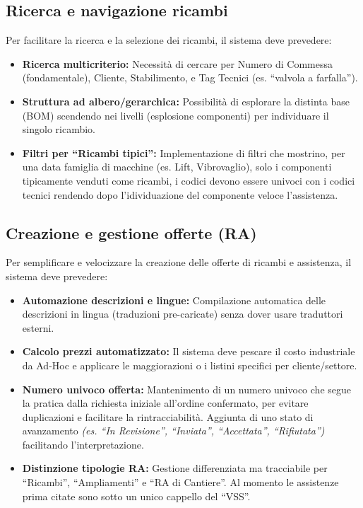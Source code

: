 \documentclass[12pt, a4paper]{article} %
\begin{document}
\subsection{Ricerca e navigazione ricambi}
Per facilitare la ricerca e la selezione dei ricambi, il sistema deve prevedere:
\begin{itemize}
      \item \textbf{Ricerca multicriterio:} Necessità di cercare per Numero di Commessa (fondamentale), Cliente, Stabilimento, e Tag Tecnici (es. ``valvola a farfalla'').
      \item \textbf{Struttura ad albero/gerarchica:} Possibilità di esplorare la distinta base (BOM) scendendo nei livelli (esplosione componenti) per individuare il singolo ricambio.
      \item \textbf{Filtri per ``Ricambi tipici'':} Implementazione di filtri che mostrino, per una data famiglia di macchine (es. Lift, Vibrovaglio), solo i componenti tipicamente venduti come ricambi,
            i codici devono essere univoci con i codici tecnici rendendo dopo l'idividuazione del componente veloce l'assistenza.
\end{itemize}

\subsection{Creazione e gestione offerte (RA)}
Per semplificare e velocizzare la creazione delle offerte di ricambi e assistenza, il sistema deve prevedere:
\begin{itemize}
      \item \textbf{Automazione descrizioni e lingue:} Compilazione automatica delle descrizioni in lingua (traduzioni pre-caricate) senza dover usare traduttori esterni.
      \item \textbf{Calcolo prezzi automatizzato:} Il sistema deve pescare il costo industriale da Ad-Hoc e applicare le maggiorazioni o i listini specifici per cliente/settore.
      \item \textbf{Numero univoco offerta:} Mantenimento di un numero univoco che segue la pratica dalla richiesta iniziale all'ordine confermato, per evitare duplicazioni e facilitare la rintracciabilità.
            Aggiunta di uno stato di avanzamento \textit{(es. ``In Revisione'', ``Inviata'', ``Accettata'', ``Rifiutata'')} facilitando l'interpretazione.
      \item \textbf{Distinzione tipologie RA:} Gestione differenziata ma tracciabile per ``Ricambi'', ``Ampliamenti'' e ``RA di Cantiere''. Al momento le assistenze prima citate sono sotto un unico cappello del ``VSS''.
\end{itemize}
\end{document}
